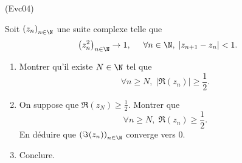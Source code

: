 \begin{tiny}(Evc04)  \end{tiny} Soit $\left( z_n \right)_{n \in \N}$ une suite complexe telle que
\[
\left( z_n^2 \right)_{n \in \N}\rightarrow 1, \hspace{0.5cm}
\forall n \in \N, \; \left| z_{n+1} - z_n\right| < 1.
\]
\begin{enumerate}
 \item Montrer qu'il existe $N\in \N$ tel que
\[
 \forall n \geq N, \;\left| \Re(z_n) \right| \geq \frac{1}{2}.
\]
\item On suppose que $\Re(z_N) \geq \frac{1}{2}$. Montrer que
\[
 \forall n \geq N, \;\Re(z_n) \geq \frac{1}{2}.
\]
En déduire que $\left( \Im(z_n) \right)_{n \in \N}$ converge vers $0$.
\item Conclure.
\end{enumerate}

